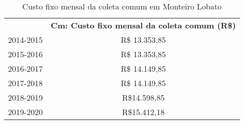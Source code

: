 \begin{table}[htbp]
  \centering
  \caption{Custo fixo mensal da coleta comum em Monteiro Lobato}
\begin{tabular}{cc}
	\rowcolor[rgb]{ .969,  .588,  .275} \multicolumn{1}{p{6.635em}}{\textcolor[rgb]{ 1,  1,  1}{\textbf{Período}}} & \multicolumn{1}{p{15.455em}}{\textcolor[rgb]{ 1,  1,  1}{\textbf{Cm: Custo fixo mensal da coleta comum (R\$)}}} \\
	\rowcolor[rgb]{ .992,  .914,  .851} 2014-2015 & R\$ 13.353,85 \\
	\rowcolor[rgb]{ .984,  .831,  .706} 2015-2016 & R\$ 13.353,85 \\
	\rowcolor[rgb]{ .992,  .914,  .851} 2016-2017 & R\$ 14.149,85 \\
	\rowcolor[rgb]{ .984,  .831,  .706} 2017-2018 & R\$ 14.149,85 \\
	\rowcolor[rgb]{ .992,  .914,  .851} 2018-2019 & R\$14.598,85 \\
	\rowcolor[rgb]{ .984,  .831,  .706} 2019-2020 & R\$15.412,18 \\
\end{tabular}%
  \label{tab:custos_fixo_mensal}%
\end{table}%